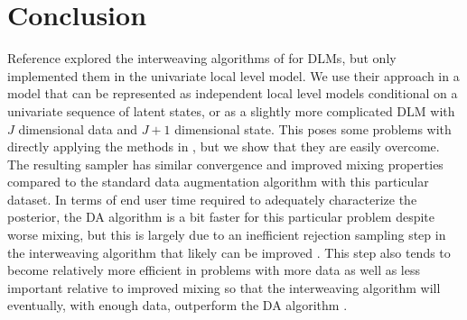\documentclass[graybox]{svmult}
\begin{document}
\section{Conclusion}\label{sec:conclusion}
Reference \cite{simpson2014interweaving} explored the interweaving algorithms of \cite{yu2011center} for DLMs, but only implemented them in the univariate local level model. We use their approach in a model that can be represented as independent local level models conditional on a univariate sequence of latent states, or as a slightly more complicated DLM with $J$ dimensional data and $J+1$ dimensional state. This poses some problems with directly applying the methods in \cite{simpson2014interweaving}, but we show that they are easily overcome. The resulting sampler has similar convergence and improved mixing properties compared to the standard data augmentation algorithm with this particular dataset. In terms of end user time required to adequately characterize the posterior, the DA algorithm is a bit faster for this particular problem despite worse mixing, but this is largely due to an inefficient rejection sampling step in the interweaving algorithm that likely can be improved \citep{simpson2014interweaving}. This step also tends to become relatively more efficient in problems with more data as well as less important relative to improved mixing so that the interweaving algorithm will eventually, with enough data, outperform the DA algorithm \citep{simpson2014interweaving}.



\end{document}
